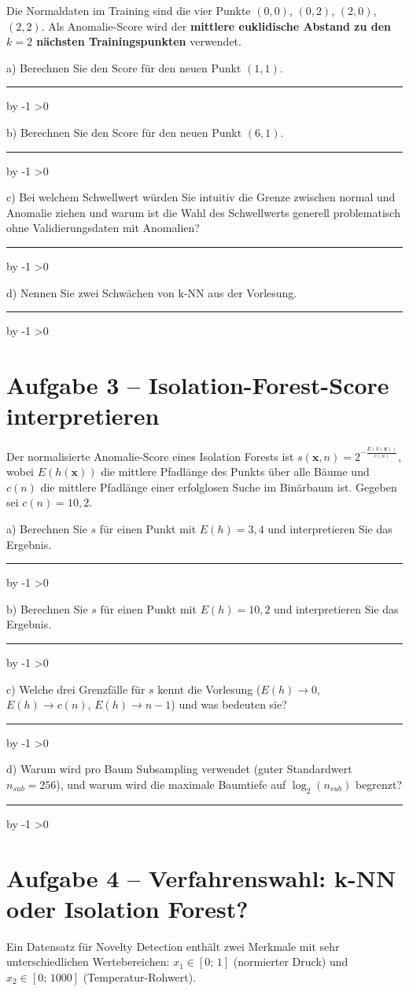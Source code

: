 \documentclass[10pt,a4paper]{article}
\newcommand{\antwortlinien}[1]{%
  \par\vspace{2pt}%
  \newcount\zeilen \zeilen=#1
  \loop
    \noindent\rule{\linewidth}{0.4pt}\par\vspace{11pt}%
    \advance\zeilen by -1
  \ifnum\zeilen>0 \repeat
}
\begin{document}
Die Normaldaten im Training sind die vier Punkte
$(0,0)$, $(0,2)$, $(2,0)$, $(2,2)$.
Als Anomalie-Score wird der \textbf{mittlere euklidische Abstand zu den $k=2$ nächsten
Trainingspunkten} verwendet.

a) Berechnen Sie den Score für den neuen Punkt $(1,1)$.
\antwortlinien{2}

b) Berechnen Sie den Score für den neuen Punkt $(6,1)$.
\antwortlinien{2}

c) Bei welchem Schwellwert würden Sie intuitiv die Grenze zwischen normal und Anomalie ziehen
und warum ist die Wahl des Schwellwerts generell problematisch ohne Validierungsdaten mit Anomalien?
\antwortlinien{3}

d) Nennen Sie zwei Schwächen von k-NN aus der Vorlesung.
\antwortlinien{2}

\section*{Aufgabe 3 -- Isolation-Forest-Score interpretieren}

Der normalisierte Anomalie-Score eines Isolation Forests ist
$s(\boldsymbol{x},n) = 2^{-\frac{E(h(\boldsymbol{x}))}{c(n)}}$,
wobei $E(h(\boldsymbol{x}))$ die mittlere Pfadlänge des Punkts über alle Bäume und
$c(n)$ die mittlere Pfadlänge einer erfolglosen Suche im Binärbaum ist.
Gegeben sei $c(n) = 10{,}2$.

a) Berechnen Sie $s$ für einen Punkt mit $E(h) = 3{,}4$ und interpretieren Sie das Ergebnis.
\antwortlinien{2}

b) Berechnen Sie $s$ für einen Punkt mit $E(h) = 10{,}2$ und interpretieren Sie das Ergebnis.
\antwortlinien{2}

c) Welche drei Grenzfälle für $s$ kennt die Vorlesung ($E(h)\to 0$, $E(h)\to c(n)$, $E(h)\to n-1$)
und was bedeuten sie?
\antwortlinien{3}

d) Warum wird pro Baum Subsampling verwendet (guter Standardwert $n_{sub}=256$),
und warum wird die maximale Baumtiefe auf $\log_2(n_{sub})$ begrenzt?
\antwortlinien{3}

\section*{Aufgabe 4 -- Verfahrenswahl: k-NN oder Isolation Forest?}

Ein Datensatz für Novelty Detection enthält zwei Merkmale mit sehr unterschiedlichen
Wertebereichen: $x_1 \in [0;\,1]$ (normierter Druck) und $x_2 \in [0;\,1000]$
(Temperatur-Rohwert).
\end{document}
